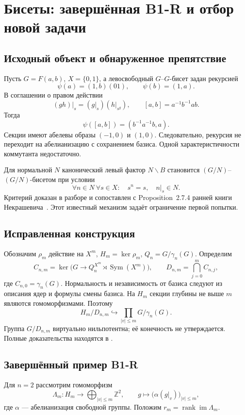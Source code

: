 \chapter{Бисеты: завершённая B1-R и отбор новой задачи}

\section{Исходный объект и обнаруженное препятствие}
Пусть \(G=F(a,b)\), \(X=\{0,1\}\), а левосвободный \(G\)--\(G\)-бисет
задан рекурсией
\[
\psi(a)=(1,b)(01),\qquad\psi(b)=(1,a).
\]
В соглашении о правом действии
\[
(gh)|_s=(g|_s)(h|_{s^g}),\qquad [a,b]=a^{-1}b^{-1}ab.
\]
Тогда
\[
\psi([a,b])=(b^{-1}a^{-1}b,a).
\]
Секции имеют абелевы образы \((-1,0)\) и \((1,0)\).
Следовательно, рекурсия не переходит на абелианизацию
с сохранением базиса. Одной характеристичности коммутанта недостаточно.

Для нормальной \(N\) канонический левый фактор \(N\backslash B\)
становится \((G/N)\)--\((G/N)\)-бисетом при условии
\[
\forall n\in N\ \forall s\in X:\quad s^n=s,\quad n|_s\in N.
\]
Критерий доказан в разборе и сопоставлен с
Proposition~2.7.4 ранней книги Некрашевича~\cite{NekraBook}.
Этот известный механизм задаёт ограничение первой попытки.

\section{Исправленная конструкция}
Обозначим \(\rho_m\) действие на \(X^m\), \(H_m=\ker\rho_m\),
\(Q_n=G/\gamma_n(G)\). Определим
\[
C_{n,m}=\ker\bigl(G\to Q_n^{X^m}\rtimes\operatorname{Sym}(X^m)\bigr),
\qquad D_{n,m}=\bigcap_{j=0}^m C_{n,j},
\]
где \(C_{n,0}=\gamma_n(G)\).
Нормальность и независимость от базиса следуют из описания ядер
и формулы смены базиса. На \(H_m\) секции глубины не выше \(m\)
являются гомоморфизмами. Поэтому
\[
H_m/D_{n,m}\hookrightarrow\prod_{|v|\le m}G/\gamma_n(G).
\]
Группа \(G/D_{n,m}\) виртуально нильпотентна; её конечность не утверждается.
Полные доказательства находятся в .

\section{Завершённый пример B1-R}
Для \(n=2\) рассмотрим гомоморфизм
\[
\Lambda_m:H_m\to\bigoplus_{|v|\le m}\mathbb Z^2,
\qquad g\mapsto\bigl(\alpha(g|_v)\bigr)_{|v|\le m},
\]
где \(\alpha\) --- абелианизация свободной группы. Положим
\(r_m=\operatorname{rank}\operatorname{im}\Lambda_m\).

